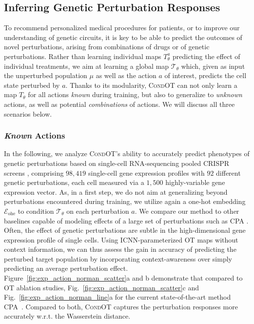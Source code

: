 \subsection{Inferring Genetic Perturbation Responses}

 To recommend personalized medical procedures for patients, or to improve our understanding of genetic circuits, it is key to be able to predict the outcomes of novel perturbations, arising from combinations of drugs or of genetic perturbations. 
Rather than learning individual maps $T_\theta^a$ predicting the effect of individual treatments, we aim at learning a global map  $\mathcal{T}_\theta$ which, given as input the unperturbed population $\mu$ as well as the action $a$ of interest, predicts the cell state perturbed by $a$.
Thanks to its modularity, \textsc{CondOT} can not only learn a map $T_\theta$ for all actions \emph{known} during training, but also to generalize to \emph{unknown} actions, as well as potential \emph{combinations} of actions. We will discuss all three scenarios below.


\subsubsection{\textit{Known} Actions} \label{sec:eval_action_known}
\vspace{-5pt}

 In the following, we analyze \textsc{CondOT}'s ability to accurately predict phenotypes of genetic perturbations based on single-cell RNA-sequencing pooled CRISPR screens \citep{norman2019exploring, dixit2016perturb}, comprising $98,419$ single-cell gene expression profiles with $92$ different genetic perturbations, each cell measured via a $1,500$ highly-variable gene expression vector.
As, in a first step, we do not aim at generalizing beyond perturbations encountered during training, we utilize again a one-hot embedding $\mathcal{E}_\text{ohe}$ to condition $\mathcal{T}_\theta$ on each perturbation $a$.
We compare our method to other baselines capable of modeling effects of a large set of perturbations such as \textsc{CPA} \citep{lotfollahi2021compositional}.
Often, the effect of genetic perturbations are subtle in the high-dimensional gene expression profile of single cells. Using ICNN-parameterized OT maps without context information, we can thus assess the gain in accuracy of predicting the perturbed target population by incorporating context-awareness over simply predicting an average perturbation effect. 
Figure~\ref{fig:exp_action_norman_scatter}a and b demonstrate that compared to OT ablation studies, Fig.~\ref{fig:exp_action_norman_scatter}c and Fig.~\ref{fig:exp_action_norman_line}a for the current state-of-the-art method \textsc{CPA}~\citep{lotfollahi2021compositional}. Compared to both, \textsc{CondOT} captures the perturbation responses more accurately w.r.t. the Wasserstein distance.

